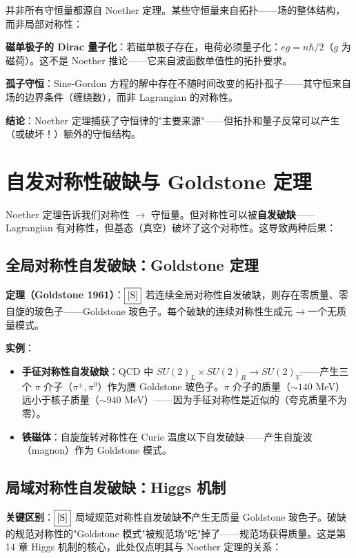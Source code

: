 并非所有守恒量都源自 Noether 定理。某些守恒量来自拓扑——场的整体结构，而非局部对称性：

\textbf{磁单极子的 Dirac 量子化}：若磁单极子存在，电荷必须量子化：$eg = n\hbar/2$（$g$ 为磁荷）。这不是 Noether 推论——它来自波函数单值性的拓扑要求。

\textbf{孤子守恒}：Sine-Gordon 方程的解中存在不随时间改变的拓扑孤子——其守恒来自场的边界条件（缠绕数），而非 Lagrangian 的对称性。

\textbf{结论}：Noether 定理捕获了守恒律的"主要来源"——但拓扑和量子反常可以产生（或破坏！）额外的守恒结构。

\section{自发对称性破缺与 Goldstone 定理}

Noether 定理告诉我们对称性 $\to$ 守恒量。但对称性可以被\textbf{自发破缺}——Lagrangian 有对称性，但基态（真空）破坏了这个对称性。这导致两种后果：

\subsection{全局对称性自发破缺：Goldstone 定理}

\textbf{定理（Goldstone 1961）}：$\fbox{[S]}$ 若连续全局对称性自发破缺，则存在零质量、零自旋的玻色子——Goldstone 玻色子。每个破缺的连续对称性生成元$\to$一个无质量模式。

\textbf{实例}：
\begin{itemize}
  \item \textbf{手征对称性自发破缺}：QCD 中 $SU(2)_L\times SU(2)_R \to SU(2)_V$——产生三个 $\pi$ 介子（$\pi^\pm, \pi^0$）作为赝 Goldstone 玻色子。$\pi$ 介子的质量（$\sim 140$ MeV）远小于核子质量（$\sim 940$ MeV）——因为手征对称性是近似的（夸克质量不为零）。
  \item \textbf{铁磁体}：自旋旋转对称性在 Curie 温度以下自发破缺——产生自旋波（magnon）作为 Goldstone 模式。
\end{itemize}

\subsection{局域对称性自发破缺：Higgs 机制}

\textbf{关键区别}：$\fbox{[S]}$ 局域规范对称性自发破缺\textbf{不}产生无质量 Goldstone 玻色子。破缺的规范对称性的"Goldstone 模式"被规范场"吃"掉了——规范场获得质量。这是第 14 章 Higgs 机制的核心，此处仅点明其与 Noether 定理的关系：

